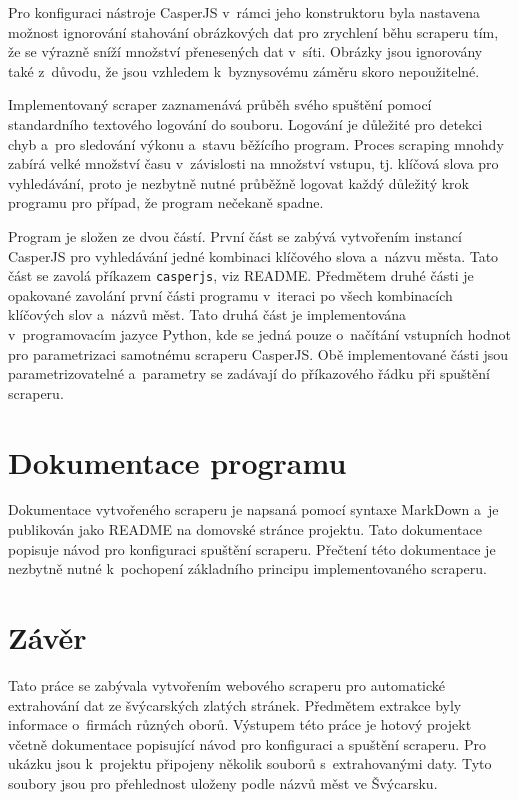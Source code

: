 \documentclass[11pt,a4paper]{article}
\begin{document}
Pro konfiguraci nástroje CasperJS v~rámci jeho konstruktoru byla nastavena možnost ignorování stahování obrázkových dat pro zrychlení běhu scraperu tím, že se výrazně sníží množství přenesených dat v~síti. Obrázky jsou ignorovány také z~důvodu, že jsou vzhledem k~byznysovému záměru skoro nepoužitelné.

Implementovaný scraper zaznamenává průběh svého spuštění pomocí standardního textového logování do souboru. Logování je důležité pro detekci chyb a~pro sledování výkonu a~stavu běžícího program. Proces scraping mnohdy zabírá velké množství času v~závislosti na množství vstupu, tj. klíčová slova pro vyhledávání, proto je nezbytně nutné průběžně logovat každý důležitý krok programu pro případ, že program nečekaně spadne.

Program je složen ze dvou částí. První část se zabývá vytvořením instancí CasperJS pro vyhledávání jedné kombinaci klíčového slova a~názvu města. Tato část se zavolá příkazem \texttt{casperjs}, viz README. Předmětem druhé části je opakované zavolání první části programu v~iteraci po všech kombinacích klíčových slov a~názvů měst. Tato druhá část je implementována v~programovacím jazyce Python, kde se jedná pouze o~načítání vstupních hodnot pro parametrizaci samotnému scraperu CasperJS. Obě implementované části jsou parametrizovatelné a~parametry se zadávají do příkazového řádku při spuštění scraperu.


\section{Dokumentace programu}
Dokumentace vytvořeného scraperu je napsaná pomocí syntaxe MarkDown a~je publikován jako README na domovské stránce projektu. Tato dokumentace popisuje návod pro konfiguraci spuštění scraperu. Přečtení této dokumentace je nezbytně nutné k~pochopení základního principu implementovaného scraperu.


\section*{Závěr}
Tato práce se zabývala vytvořením webového scraperu pro automatické extrahování dat ze švýcarských zlatých stránek. Předmětem extrakce byly informace o~firmách různých oborů. Výstupem této práce je hotový projekt včetně dokumentace popisující návod pro konfiguraci a spuštění scraperu. Pro ukázku jsou k~projektu připojeny několik souborů s~extrahovanými daty. Tyto soubory jsou pro přehlednost uloženy podle názvů měst ve Švýcarsku.
\end{document}
